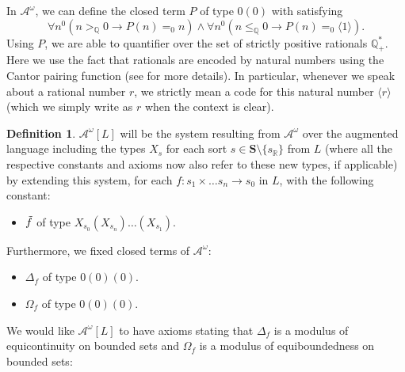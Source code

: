 \documentclass[11pt]{amsart}
\theoremstyle{definition}
\newtheorem{definition}[theorem]{Definition}
\theoremstyle{remark}
\def\QQ{\mathbb{Q}}
\def\RR{\mathbb{R}}
\begin{document}
In $\mathcal{A}^\omega$, we can define the closed term $P$ of type $0(0)$ with satisfying 
\[
\forall n^0( n >_\QQ 0 \to P(n)=_0 n) \land \forall n^0( n \le_\QQ 0 \to P(n)=_0 \langle 1\rangle).
\]
Using $P$, we are able to quantifier over the set of strictly positive rationals $\QQ^*_+$. Here we use the fact that rationals are encoded by natural numbers using the Cantor pairing function (see \cite{Kohlenbach2008} for more details). In particular, whenever we speak about a rational number $r$, we strictly mean a code for this natural number $\langle r\rangle$ (which we simply write as $r$ when the context is clear).
\begin{definition}
     $\mathcal{A}^\omega[L]$ will be the system resulting from $\mathcal{A}^\omega$ over the augmented language
including the types $X_s$ for each sort $s \in \mathbf{S}\setminus\{s_\RR\}$ from $L$ (where all the respective constants and axioms now also refer to these new types, if applicable) by extending this system, for each $f:s_1 \times \ldots s_n \to s_0 $ in $L$, with the following constant:
\begin{itemize}
    \item $\Tilde{f}$ of type $X_{s_0}(X_{s_n})\ldots(X_{s_1})$.
\end{itemize}
Furthermore, we fixed closed terms of $\mathcal{A}^\omega$:
\begin{itemize}
    \item $\Delta_f$ of type $0(0)(0)$.
    \item $\Omega_f$ of type $0(0)(0)$.
\end{itemize}
\end{definition}
We would like  $\mathcal{A}^\omega[L]$ to have axioms stating that $\Delta_f$ is a modulus of equicontinuity on bounded sets and $\Omega_f$  is a modulus of equiboundedness on bounded sets:
\end{document}
